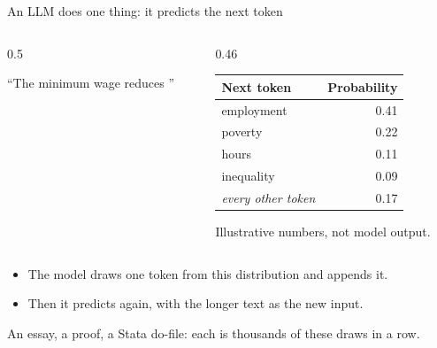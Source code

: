 \documentclass[aspectratio=169,11pt]{beamer}
\begin{document}
\begin{frame}{An LLM does one thing: it predicts the next token}

\begin{columns}[c]
\begin{column}{0.5\textwidth}
\begin{center}
{\large ``The minimum wage reduces \underline{\hspace{1.2cm}}''}
\end{center}
\end{column}
\begin{column}{0.46\textwidth}
\footnotesize
\begin{tabular}{@{}lr@{}}
\toprule
Next token & Probability \\
\midrule
employment & 0.41 \\
poverty & 0.22 \\
hours & 0.11 \\
inequality & 0.09 \\
\emph{every other token} & 0.17 \\
\bottomrule
\end{tabular}

\vspace{0.1cm}
{\scriptsize\color{warmgray}Illustrative numbers, not model output.}
\end{column}
\end{columns}

\vspace{0.45cm}

\begin{itemize}\setlength\itemsep{0.3em}
    \item The model draws one token from this distribution and appends it.
    \item Then it predicts again, with the longer text as the new input.
\end{itemize}

\vspace{0.3cm}

\alert{An essay, a proof, a Stata do-file: each is thousands of these draws in a row.}

\end{frame}
\end{document}
